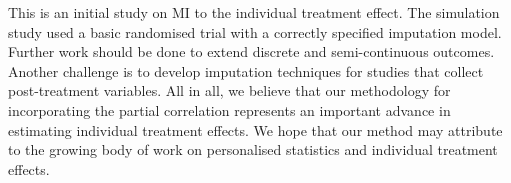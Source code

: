 	This is an initial study on MI to the individual treatment effect. The simulation study used a basic randomised trial with a correctly specified imputation model. Further work should be done to extend discrete and semi-continuous outcomes. Another challenge is to develop imputation techniques for studies that collect post-treatment variables. All in all, we believe that our methodology for incorporating the partial correlation represents an important advance in estimating individual treatment effects. We hope that our method may attribute to the growing body of work on personalised statistics and individual treatment effects. 
